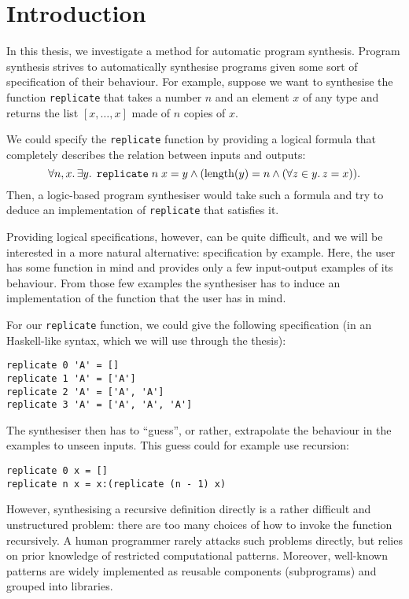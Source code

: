\lstset{style=plain}

\chapter{Introduction}\label{ch:introduction}
In this thesis, we investigate a method for automatic program synthesis.  Program synthesis strives to automatically synthesise programs given some sort of specification of their behaviour.   For example, suppose we want to synthesise the function \lstinline!replicate! that takes a number $n$ and an element $x$ of any type and returns the list $[x, \dots, x]$ made of $n$ copies of $x$.

We could specify the \lstinline!replicate! function by providing a logical formula that completely describes the relation between inputs and outputs: \[ \forall n, x \ldotp \exists y \ldotp \; \texttt{replicate} \; n \; x = y \land (\mathrm{length}(y) = n \land (\forall z \in y \ldotp z = x)). \]  Then, a logic-based program synthesiser would take such a formula and try to deduce an implementation of \lstinline!replicate! that satisfies it.

Providing logical specifications, however, can be quite difficult, and we will be interested in a more natural alternative: specification by example.  Here, the user has some function in mind and provides only a few input-output examples of its behaviour.  From those few examples the synthesiser has to induce an implementation of the function that the user has in mind.

For our \lstinline!replicate! function, we could give the following specification (in an Haskell-like syntax, which we will use through the thesis):
\begin{lstlisting}[style=plain]
replicate 0 'A' = []
replicate 1 'A' = ['A']
replicate 2 'A' = ['A', 'A']
replicate 3 'A' = ['A', 'A', 'A']
\end{lstlisting}
The synthesiser then has to ``guess'', or rather, extrapolate the behaviour in the examples to unseen inputs.  This guess could for example use recursion:
\begin{lstlisting}[style=plain]
replicate 0 x = []
replicate n x = x:(replicate (n - 1) x)
\end{lstlisting}

However, synthesising a recursive definition directly is a rather difficult and unstructured problem: there are too many choices of how to invoke the function recursively.  A human programmer rarely attacks such problems directly, but relies on prior knowledge of restricted computational patterns.  Moreover, well-known patterns are widely implemented as reusable components (subprograms) and grouped into libraries.

